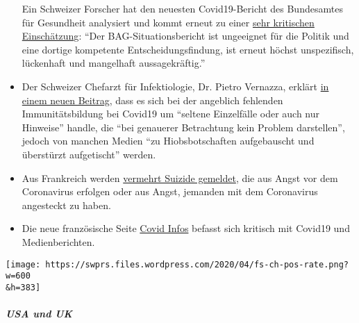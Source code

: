 \begin{itemize}
  Ein Schweizer Forscher hat den neuesten Covid19-Bericht des
  Bundesamtes für Gesundheit analysiert und kommt erneut zu einer
  \href{https://covid-19-fakten.blogspot.com/2020/04/der-bag-situationsbericht-vom-1442020.html}{sehr
  kritischen Einschätzung}: ``Der BAG-Situations­bericht ist ungeeignet
  für die Politik und eine dortige kompetente Entscheidungs­findung, ist
  erneut höchst unspezifisch, lückenhaft und mangelhaft
  aussagekräftig.''
\item
  Der Schweizer Chefarzt für Infektiologie, Dr. Pietro Vernazza, erklärt
  \href{https://infekt.ch/2020/04/hinterlaesst-coronavirus-eine-immunitaet/}{in
  einem neuen Beitrag}, dass es sich bei der angeblich fehlenden
  Immunitätsbildung bei Covid19 um ``seltene Einzelfälle oder auch nur
  Hinweise'' handle, die ``bei genauerer Betrachtung kein Problem
  darstellen'', jedoch von manchen Medien ``zu Hiobsbotschaften
  aufgebauscht und überstürzt aufgetischt'' werden.
\item
  Aus Frankreich werden
  \href{https://www.midilibre.fr/2020/04/09/coronavirus-ces-suicides-de-malades-ou-de-personnes-tenaillees-par-langoisse,8839373.php}{vermehrt
  Suizide gemeldet}, die aus Angst vor dem Coronavirus erfolgen oder aus
  Angst, jemanden mit dem Coronavirus angesteckt zu haben.
\item
  Die neue französische Seite \href{https://covidinfos.net/}{Covid
  Infos} befasst sich kritisch mit Covid19 und Medienberichten.
\end{itemize}

\texttt{[image: https://swprs.files.wordpress.com/2020/04/fs-ch-pos-rate.png?w=600\\\&h=383]}

\hypertarget{usa-und-uk}{%
\subparagraph{\texorpdfstring{\textbf{USA und
UK}}{USA und UK}}\label{usa-und-uk}}

